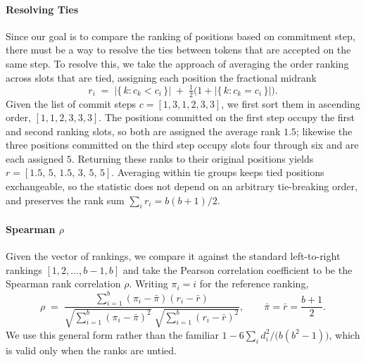 \paragraph{Resolving Ties}
Since our goal is to compare the ranking of positions based on commitment
step, there must be a way to resolve the ties between tokens that are
accepted on the same step. To resolve this, we take the approach of
averaging the order ranking across slots that are tied, assigning each
position the fractional midrank
\begin{equation}
  r_i \;=\; \bigl|\{\,k : c_k < c_i\,\}\bigr|
        \;+\; \tfrac{1}{2}\bigl(1 + \bigl|\{\,k : c_k = c_i\,\}\bigr|\bigr).
\end{equation}
Given the list of commit steps $c = [1, 3, 1, 2, 3, 3]$, we first sort them
in ascending order, $[1, 1, 2, 3, 3, 3]$. The positions committed on the
first step occupy the first and second ranking slots, so both are assigned
the average rank $1.5$; likewise the three positions committed on the third
step occupy slots four through six and are each assigned $5$. Returning
these ranks to their original positions yields
$r = [1.5,\, 5,\, 1.5,\, 3,\, 5,\, 5]$. Averaging within tie groups keeps
tied positions exchangeable, so the statistic does not depend on an
arbitrary tie-breaking order, and preserves the rank sum
$\sum_i r_i = b(b+1)/2$.

\paragraph{Spearman $\rho$}
Given the vector of rankings, we compare it against the standard
left-to-right rankings $[1, 2, \dots, b-1, b]$ and take the Pearson
correlation coefficient to be the Spearman rank correlation $\rho$. Writing
$\pi_i = i$ for the reference ranking,
\begin{equation}
  \rho \;=\;
  \frac{\sum_{i=1}^{b} (\pi_i - \bar{\pi})(r_i - \bar{r})}
       {\sqrt{\sum_{i=1}^{b} (\pi_i - \bar{\pi})^{2}}\;
        \sqrt{\sum_{i=1}^{b} (r_i - \bar{r})^{2}}},
  \qquad \bar{\pi} = \bar{r} = \frac{b+1}{2}.
\end{equation}
We use this general form rather than the familiar
$1 - 6\sum_i d_i^{2}/\bigl(b(b^{2}-1)\bigr)$, which is valid only when the
ranks are untied.


